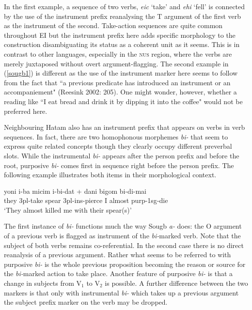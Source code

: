 In the first example, a sequence of two verbs, \textit{eic} `take' and \textit{ehi} `fell' is connected by the use of the instrument prefix reanalysing the T argument of the first verb as the instrument of the second. Take-action sequences are quite common throughout EI but the instrument prefix here adds specific morphology to the construction disambiguating its status as a coherent unit as it seems. This is in contrast to other languages, especially in the \textsc{nus} region, where the verbs are merely juxtaposed without overt argument-flagging. The second example in (\ref{sougb1}) is different as the use of the instrument marker here seems to follow from the fact that ``a previous predicate has introduced an instrument or an accompaniement" (Reesink 2002: 205). One might wonder, however, whether a reading like ``I eat bread and drink it by dipping it into the coffee" would not be preferred here.

Neighbouring Hatam also has an instrument prefix that appears on verbs in verb sequences. In fact, there are two homophonous morphemes \textit{bi-} that seem to express quite related concepts though they clearly occupy different preverbal slots. While the instrumental \textit{bi-} appears after the person prefix and before the root, purposive \textit{bi-} comes first in sequence right before the person prefix. The following example illustrates both items in their morphological context.

\ea 
\gll yoni i-ba micim i-bi-dat + dani bigom bi-di-mai \\
they \acs{3}\acs{pl}-take spear \acs{3}\acs{pl}-\acs{ins}-pierce I almost \acs{purp}-\acs{1}\acs{sg}-die \\
\glft `They almost killed me with their spear(s)' \\ 
\z
\xe

The first instance of \textit{bi-} functions much the way Sougb \textit{a-} does: the O argument of a previous verb is flagged as instrument of the \textit{bi-}marked verb. Note that the subject of both verbs remains co-referential. In the second case there is no direct reanalysis of a previous argument. Rather what seems to be referred to with purposive \textit{bi-} is the whole previous proposition becoming the reason or source for the \textit{bi-}marked action to take place. Another feature of purposive \textit{bi-} is that a change in subjects from V$_1$ to V$_2$ is possible. A further difference between the two markers is that only with instrumental \textit{bi-} which takes up a previous argument the subject prefix marker on the verb may be dropped.

